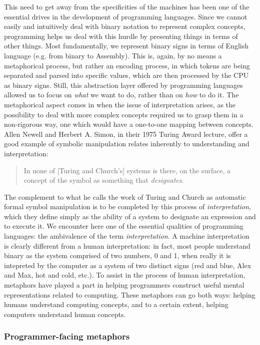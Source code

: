 This need to get away from the specificities of the machines has been one of the essential drives in the development of programming languages. Since we cannot easily and intuitively deal with binary notation to represent complex concepts, programming helps us deal with this hurdle by presenting things in terms of other things. Most fundamentally, we represent binary signs in terms of English language (e.g. from binary to Assembly). This is, again, by no means a metaphorical process, but rather an encoding process, in which tokens are being separated and parsed into specific values, which are then processed by the CPU as binary signs. Still, this abstraction layer offered by programming languages allowed us to focus on \emph{what} we want to do, rather than on \emph{how} to do it. The metaphorical aspect comes in when the issue of interpretation arises, as the possibility to deal with more complex concepts required us to grasp them in a non-rigorous way, one which would have a one-to-one mapping between concepts. Allen Newell and Herbert A. Simon, in their 1975 Turing Award lecture, offer a good example of symbolic manipulation relates inherently to understanding and interpretation:

\begin{quote}
  In none of [Turing and Church's] systems is there, on the surface, a concept of the symbol as something that \emph{designates}.
\end{quote}

The complement to what he calls the work of Turing and Church as automatic formal symbol manipulation is to be completed by this process of \emph{interpretation}, which they define simply as the ability of a system to designate an expression and to execute it. We encounter here one of the essential qualities of programming languages: the ambivalence of the term \emph{interpretation}. A machine interpretation is clearly different from a human interpretation: in fact, most people understand binary as the system comprised of two numbers, 0 and 1, when really it is intepreted by the computer as a system of two distinct signs (red and blue, Alex and Max, hot and cold, etc.). To assist in the process of human interpretation, metaphors have played a part in helping programmers construct useful mental representations related to computing. These metaphors can go both ways: helping humans understand computing concepts, and to a certain extent, helping computers understand human concepts.

\subsubsection{Programmer-facing metaphors}

